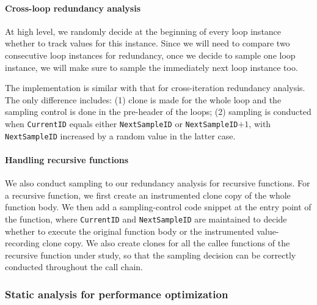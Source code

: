 
\paragraph{Cross-loop redundancy analysis} 
At high level, we randomly decide at the beginning
of every loop instance whether to track values for this instance. 
Since we will need to compare two consecutive loop
instances for redundancy, once we decide to sample one loop instance, we will
make sure to sample the immediately next loop instance too.

The implementation is similar with that for cross-iteration redundancy analysis.
The only difference includes: (1) clone is made for the whole loop and the
sampling control
is done in the pre-header of the loops; (2)
sampling is conducted when \texttt{CurrentID} equals either
\texttt{NextSampleID} or \texttt{NextSampleID}$+1$, with \texttt{NextSampleID}
increased by a random value in the latter case.




\paragraph{Handling recursive functions}
We also conduct sampling to our redundancy analysis for recursive functions.
For a recursive function, we first create an instrumented clone copy of 
the whole function body.
We then add a sampling-control code snippet at the entry point of the function,
where \texttt{CurrentID} and \texttt{NextSampleID} are maintained to decide
whether to execute the original function body or the instrumented 
value-recording clone copy.
We also create clones for all the callee functions of the recursive function
under study, so that the sampling decision can be correctly conducted
throughout the call chain.

\subsubsection{Static analysis for performance optimization}
\label{sec:6_perf}

